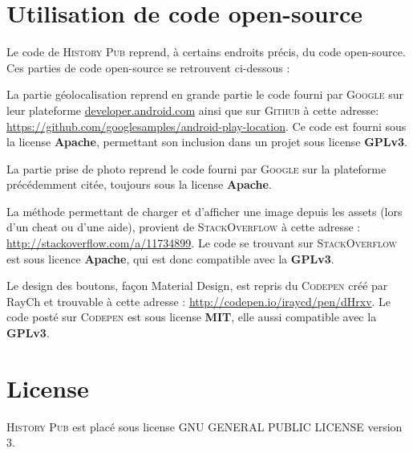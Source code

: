 \documentclass[11pt]{scrreprt}
\begin{document}
    \chapter{Utilisation de code open-source}
    Le code de \textsc{History Pub} reprend, à certains endroits précis, du code open-source. Ces parties de code open-source se retrouvent ci-dessous :

    \begin{description}[style=nextline]
        \item[EtapeActivity.java et PhotoActivity.java] La partie géolocalisation reprend en grande partie le code fourni par \textsc{Google} sur leur plateforme \url{developer.android.com} ainsi que sur \textsc{Github} à cette adresse: \url{https://github.com/googlesamples/android-play-location}. Ce code est fourni sous la license \textbf{Apache}, permettant son inclusion dans un projet sous license \textbf{GPLv3}.
        \item[PhotoActivity.java] La partie prise de photo reprend le code fourni par \textsc{Google} sur la plateforme précédemment citée, toujours sous la license \textbf{Apache}.
        \item[PhotoActivity.java] La méthode permettant de charger et d'afficher une image depuis les assets (lors d'un cheat ou d'une aide), provient de \textsc{StackOverflow} à cette adresse : \url{http://stackoverflow.com/a/11734899}. Le code se trouvant sur \textsc{StackOverflow} est sous licence \textbf{Apache}, qui est donc compatible avec la \textbf{GPLv3}.
        \item[Style.css] Le design des boutons, façon Material Design, est repris du \textsc{Codepen} créé par RayCh et trouvable à cette adresse : \url{http://codepen.io/iraycd/pen/dHrxv}. Le code posté sur \textsc{Codepen} est sous license \textbf{MIT}, elle aussi compatible avec la \textbf{GPLv3}.
    \end{description}

    \chapter{License}

    \noindent \textsc{History Pub} est placé sous license GNU GENERAL PUBLIC LICENSE version 3.
    \hfill\\
\end{document}
